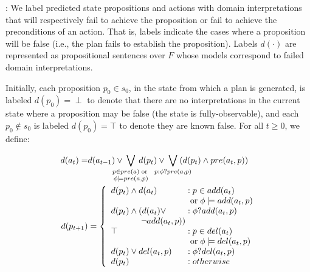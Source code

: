 \documentclass[letterpaper]{article}
\def\und#1{\noindent{\bf #1}:}
\begin{document}
\und{Planning} We label predicted state propositions and actions with domain
interpretations that will respectively fail to achieve the proposition or fail
to achieve the preconditions of an action.  That is, labels indicate the cases
where a proposition will be false (i.e., the plan fails to establish the
proposition). Labels $d(\cdot)$ are represented as  propositional sentences over
$F$ whose models correspond to failed domain interpretations.


Initially, each proposition $p_0 \in s_0$, in the state from which a plan is
generated, is labeled $d(p_0) = \perp$ to denote that there are no
interpretations in the current state where a proposition may be false (the state is fully-observable), and each $p_0 \not\in
s_0$ is labeled $d(p_0)=\top$ to denote they are known false.
For all $t \geq 0$, we define:

 \begin{align}
\notag d({a}_t) =&  
d(a_{t-1}) \vee\hspace*{-.5cm} \bigvee\limits_{\substack{p \in pre(a)
\;\text{or}\;\\\phi \models pre(a, p)}}\hspace*{-.5cm} d(p_t) \vee
\hspace*{-.5cm}\bigvee\limits_{\substack{p : \phi?pre(a, p)}}
\hspace*{-.5cm}(d(p_t)\wedge pre({a}_t, p)  ) \notag %
\\
\notag\hspace*{-.1cm}d(p_{t+1}) &= \left\{
\begin{array}{l@{\;}l@{\;}r}
d(p_t) \wedge d({a}_t) & : p \in add({a}_t) \\ 
 & \;\text{or}\; \phi \models add({a}_t, p)\\
d(p_t) \wedge (d({a}_t) \vee & : \phi?add({a}_t,p)\\
 \hspace*{1.25cm} \neg add({a}_t, p)) \\  
\top & : p \in del({a}_t)\\
 & \;\text{or}\; \phi \models del({a}_t,p)\\
d(p_t) \vee  del({a}_t, p)  &: \phi?del({a}_t, p)\\
d(p_t) & : {otherwise} 
\end{array}
\right. 
\end{align}
\end{document}
